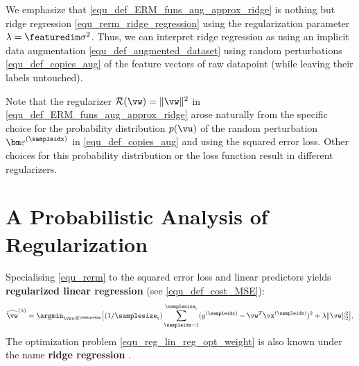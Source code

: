 \documentclass[12pt]{report}
\newcommand{\featurelen}{\featuredim}
\begin{document}
We emphasize that \eqref{equ_def_ERM_funs_aug_approx_ridge} is nothing but ridge regression 
\eqref{equ_rerm_ridge_regression} using the regularization parameter $\lambda  =\featurelen \sigma^{2}$. 
Thus, we can interpret ridge regression as using an implicit data augmentation \eqref{equ_def_augmented_dataset} 
using random perturbations \eqref{equ_def_copies_aug} of the feature vectors of raw datapoint (while leaving their 
labels untouched). 

Note that the regularizer $\mathcal{R}(\vw) = \| \vw \|^{2}$ in \eqref{equ_def_ERM_funs_aug_approx_ridge} 
arose naturally from the specific choice for the probability distribution $p(\vu)$ of the random perturbation ${\bm \varepsilon}^{(\sampleidx)}$ 
in \eqref{equ_def_copies_aug} and using the squared error loss. Other choices for this probability distribution or the 
loss function result in different regularizers. 





  

 







\section{A Probabilistic Analysis of Regularization}
\label{sec_prob_mod_regularization}

Specialising \eqref{equ_rerm} to the squared error loss and linear predictors 
yields {\bf regularized linear regression} (see \eqref{equ_def_cost_MSE}): 
\begin{equation} 
\label{equ_reg_lin_reg_opt_weight}
\widehat{\vw}^{(\lambda)} = \argmin_{\vw \in \mathbb{R}^{\featuredim}} \big[ (1/\samplesize_{\rm t}) \sum_{\sampleidx=1}^{\samplesize_{\rm t}}  (y^{(\sampleidx)} - \vw^{T}\vx^{(\sampleidx)}  )^2 + \lambda \| \vw \|^{2}_{2}\big], 
\end{equation} 
The optimization problem \eqref{equ_reg_lin_reg_opt_weight} is also known 
under the name {\bf ridge regression} \cite{hastie01statisticallearning}. 

\end{document}
